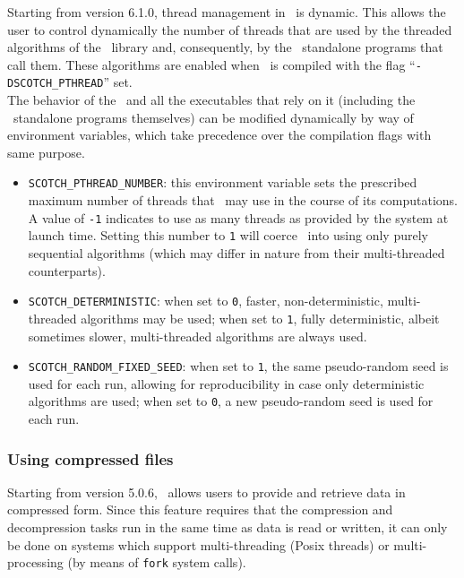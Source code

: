 Starting from version \textsc{6.1.0}, thread management in \scotch\ is
dynamic. This allows the user to control dynamically the number of
threads that are used by the threaded algorithms of the
\libscotch\ library and, consequently, by the \scotch\ standalone
programs that call them. These algorithms are enabled when \scotch\ is
compiled with the flag ``\texttt{-DSCOTCH\_\lbt PTHREAD}'' set.
\\

The behavior of the \libscotch\ and all the executables that rely on
it (including the \scotch\ standalone programs themselves) can be
modified dynamically by way of environment variables, which take
precedence over the compilation flags with same purpose.
\begin{itemize}
\item
\texttt{SCOTCH\_PTHREAD\_NUMBER}: this environment variable sets the
prescribed maximum number of threads that \scotch\ may use in the
course of its computations. A value of \texttt{-1} indicates to use as
many threads as provided by the system at launch time. Setting this
number to \texttt{1} will coerce \scotch\ into using only purely
sequential algorithms (which may differ in nature from their
multi-threaded counterparts).
\item
\texttt{SCOTCH\_DETERMINISTIC}: when set to \texttt{0}, faster,
non-deterministic, multi-threaded algorithms may be used; when set to
\texttt{1}, fully deterministic, albeit sometimes slower,
multi-threaded algorithms are always used.
\item
\texttt{SCOTCH\_RANDOM\_FIXED\_SEED}: when set to \texttt{1}, the same
pseudo-random seed is used for each run, allowing for reproducibility
in case only deterministic algorithms are used; when set to
\texttt{0}, a new pseudo-random seed is used for each run.
\end{itemize}

\subsubsection{Using compressed files}
\label{sec-prog-compressed}

Starting from version 5.0.6, \scotch\ allows users to provide and
retrieve data in compressed form. Since this feature requires that
the compression and decompression tasks run in the same time as data
is read or written, it can only be done on systems which support
multi-threading (Posix threads) or multi-processing (by means of
{\tt fork} system calls).

